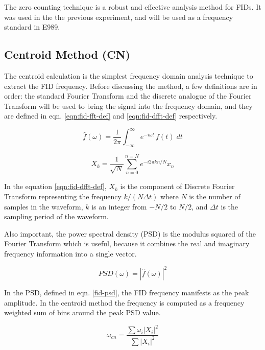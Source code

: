 The zero counting technique is a robust and effective analysis method for FIDs.  It was used in the the previous \mugmtwo experiment, and will be used as a frequency standard in E989.

\subsection{Centroid Method (CN)}
The centroid calculation is the simplest frequency domain analysis technique to extract the FID frequency.  Before discussing the method, a few definitions are in order: the standard Fourier Transform and the discrete analogue of the Fourier Transform will be used to bring the signal into the frequency domain, and they are defined in eqn. \ref{eqn:fid-fft-def} and \ref{eqn:fid-dfft-def} respectively.

\begin{equation}
\label{eqn:fid-fft-def}
\hat{f}(\omega) = \frac{1}{2\pi} \int_{-\infty}^{\infty} e^{-i \omega t}\, f(t) \;dt
\end{equation}

\begin{equation}
\label{eqn:fid-dfft-def}
X_k = \frac{1}{\sqrt{N}} \sum_{n=0}^{n=N} e^{-i 2\pi k n / N} x_n
\end{equation}

\noindent
In the equation \ref{eqn:fid-dfft-def}, $X_k$ is the component of Discrete Fourier Transform representing the frequency $k / (N \Delta t)$ where $N$ is the number of samples in the waveform, $k$ is an integer from $-N/2$ to $N/2$, and $\Delta t$ is the sampling period of the waveform.  

Also important, the power spectral density (PSD) is the modulus squared of the Fourier Transform which is useful, because it combines the real and imaginary frequency information into a single vector.

\begin{equation}
\label{eqn:fid-psd}
PSD(\omega) = |\hat{f}(\omega)|^2
\end{equation}

\noindent
In the PSD, defined in eqn. \ref{fid-psd}, the FID frequency manifests as the peak amplitude.  In the centroid method the frequency is computed as a frequency weighted sum of bins around the peak PSD value.

\begin{equation}
\label{eqn:freq-cn}
\omega_{cn} = 
\frac{\sum \omega_i |X_i|^2}{\sum |X_i|^2}
\end{equation}

